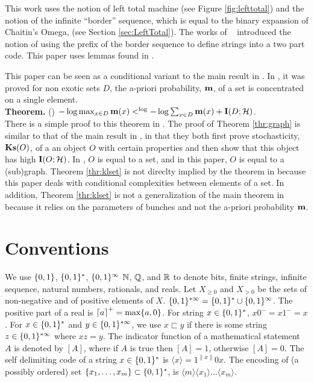 \documentclass[11pt]{article}\textwidth 6.5in\textheight 9in
\begin{document}
This work uses the notion of left total machine (see Figure \ref{fig:lefttotal}) and the notion of the infinite ``border'' sequence, which is equal to the binary expansion of Chaitin's Omega, (see Section \ref{sec:LeftTotal}). The works of ~\citep{VereshchaginVi04v2,GacsTrVi01} introduced the notion of using the prefix of the border sequence to define strings into a two part code.
This paper uses lemmas found in \citep{Epstein21}.

This paper can be seen as a conditional variant to the main result in \cite{Levin16}. In \cite{Levin16}, it was proved for non exotic sets $D$, the a-priori probability, ${\mathbf {m}}$, of a set is concentrated on a single element.\\

\noindent \textbf{Theorem.} (\cite{Levin16}) $-\log \max_{x \in D}{\mathbf {m}}(x)<^{\log}-\log \sum_{x \in D}{\mathbf {m}}(x)+ {\mathbf I}(D;{\mathcal H})$.\\

There is a simple proof to this theorem in \cite{Shen12}. The proof of Theorem \ref{thr:graph} is similar to that of the main result in \cite{Levin16}, in that they both first prove stochasticity, $\mathbf{Ks}(O)$, of a an object $O$ with certain properties and then show that this object has high ${\mathbf I}(O;{\mathcal H})$. In \cite{Levin16}, $O$ is equal to a set, and in this paper, $O$ is equal to a (sub)graph. Theorem \ref{thr:klset} is not direclty implied by the theorem in \cite{Levin16} because this paper deals with conditional complexities between elements of a set. In addition, Theorem \ref{thr:klset} is not a generalization of the main theorem in \cite{Levin16} because it relies on the parameters of bunches and not the a-priori probability ${\mathbf {m}}$.

\section{Conventions}

\label{sec:conv}
We use $\{0,1\}$, $\{0,1\}^*$, $\{0,1\}^\infty$ $\mathbb{N}$, $\mathbb{Q}$, and $\mathbb{R}$ to denote bits, finite strings, infinite sequence, natural numbers, rationals, and reals. Let $X_{\geq 0}$ and $X_{> 0}$ be the sets of non-negative and of positive elements of $X$. $\{0,1\}^{*\infty}=\{0,1\}^*\cup\{0,1\}^\infty$. The positive part of a real is ${\lceil a\rceil}^+=\max\{a,0\}$.  For string $x\in\{0,1\}^*$, $x0^-=x1^-=x$. For $x\in\{0,1\}^*$ and $y\in\{0,1\}^{*\infty}$, we use $x\sqsubset y$ if there is some string $z\in\{0,1\}^{*\infty}$ where $xz=y$. The indicator function of a mathematical statement $A$ is denoted by $[A]$, where if $A$ is true then $[A]=1$, otherwise $[A]=0$. The self delimiting code of a string $x\in\{0,1\}^*$ is $\langle x\rangle = 1^{\|x\|}0x$. The encoding of (a possibly ordered) set $\{x_1,\dots,x_m\}\subset\{0,1\}^*$, is $\langle m\rangle\langle x_1\rangle\dots\langle x_m\rangle$. 
\end{document}
